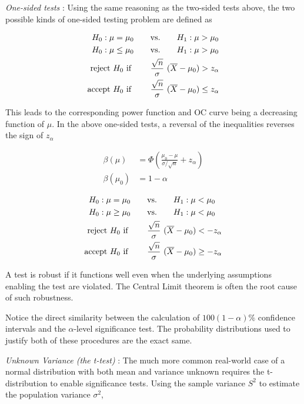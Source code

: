 \textit{One-sided tests} : Using the same reasoning as the two-sided tests above, the two possible kinds of one-sided testing problem are defined as

\begin{align}
	H_0 : \mu = \mu_0 \qquad &\text{vs.} \qquad H_1 : \mu > \mu_0 \nonumber \\
	H_0 : \mu \leq \mu_0 \qquad &\text{vs.} \qquad H_1 : \mu > \mu_0 \nonumber \\
	\text{reject $ H_0 $ if } \qquad & \frac{\sqrt{n}}{\sigma}\ (\overline{X} - \mu_0)  > z_{\alpha} \nonumber \\
	\text{accept $ H_0 $ if } \qquad & \frac{\sqrt{n}}{\sigma}\  (\overline{X} - \mu_0)  \leq z_{\alpha}
\end{align}

This leads to the corresponding power function and OC curve being a decreasing function of $ \mu $. In the above one-sided tests, a reversal of the inequalities reverses the sign of $ z_\alpha $

\begin{align}
	\beta(\mu) &= \Phi\left(\frac{\mu_0 - \mu}{\sigma/\sqrt{n}} + z_{\alpha}\right) \\
	\beta(\mu_0) &= 1 - \alpha
\end{align}

\begin{align}
	H_0 : \mu = \mu_0 \qquad &\text{vs.} \qquad H_1 : \mu < \mu_0 \nonumber \\
	H_0 : \mu \geq \mu_0 \qquad &\text{vs.} \qquad H_1 : \mu < \mu_0  \nonumber \\
	\text{reject $ H_0 $ if } \qquad & \frac{\sqrt{n}}{\sigma}\ (\overline{X} - \mu_0)  < -z_{\alpha} \nonumber \\
	\text{accept $ H_0 $ if } \qquad & \frac{\sqrt{n}}{\sigma}\  (\overline{X} - \mu_0)  \geq -z_{\alpha}
\end{align}

A test is robust if it functions well even when the underlying assumptions enabling the test are violated. The Central Limit theorem is often the root cause of such robustness.

Notice the direct similarity between the calculation of $ 100(1-\alpha)\% $ confidence intervals and the $ \alpha $-level significance test. The probability distributions used to justify both of these procedures are the exact same.

\textit{Unknown Variance (the t-test) } : The much more common real-world case of a normal distribution with both mean and variance unknown requires the t-distribution to enable significance tests. Using the sample variance $ S^2 $ to estimate the population variance $ \sigma^2 $,

